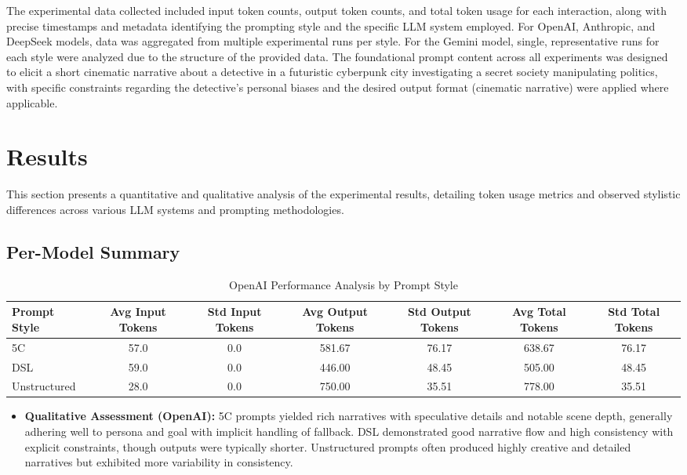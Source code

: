 \documentclass[10pt, a4paper]{article}
\begin{document}
The experimental data collected included input token counts, output token counts, and total token usage for each interaction, along with precise timestamps and metadata identifying the prompting style and the specific LLM system employed. For OpenAI, Anthropic, and DeepSeek models, data was aggregated from multiple experimental runs per style. For the Gemini model, single, representative runs for each style were analyzed due to the structure of the provided data. The foundational prompt content across all experiments was designed to elicit a short cinematic narrative about a detective in a futuristic cyberpunk city investigating a secret society manipulating politics, with specific constraints regarding the detective's personal biases and the desired output format (cinematic narrative) were applied where applicable.

\section{Results}
This section presents a quantitative and qualitative analysis of the experimental results, detailing token usage metrics and observed stylistic differences across various LLM systems and prompting methodologies.

\subsection{Per-Model Summary}

\begin{table}[H]
    \centering
    \caption{OpenAI Performance Analysis by Prompt Style}
    \label{tab:openai_performance}
    \begin{tabular}{lcccccc}
        \toprule
        \textbf{Prompt Style} & \textbf{Avg Input Tokens} & \textbf{Std Input Tokens} & \textbf{Avg Output Tokens} & \textbf{Std Output Tokens} & \textbf{Avg Total Tokens} & \textbf{Std Total Tokens} \\
        \midrule
        5C           & 57.0 & 0.0 & 581.67 & 76.17 & 638.67 & 76.17 \\
        DSL          & 59.0 & 0.0 & 446.00 & 48.45 & 505.00 & 48.45 \\
        Unstructured & 28.0 & 0.0 & 750.00 & 35.51 & 778.00 & 35.51 \\
        \bottomrule
    \end{tabular}
    \begin{itemize}
        \item \textbf{Qualitative Assessment (OpenAI):} 5C prompts yielded rich narratives with speculative details and notable scene depth, generally adhering well to persona and goal with implicit handling of fallback. DSL demonstrated good narrative flow and high consistency with explicit constraints, though outputs were typically shorter. Unstructured prompts often produced highly creative and detailed narratives but exhibited more variability in consistency.
    \end{itemize}
\end{table}
\end{document}
